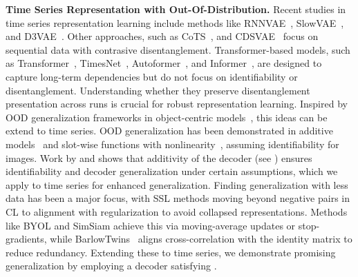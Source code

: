 \documentclass{article} %
\theoremstyle{plain}
\theoremstyle{definition}
\theoremstyle{remark}
\numberwithin{equation}{section}
\begin{document}
\textbf{Time Series Representation with Out-Of-Distribution.} 
Recent studies in time series representation learning include methods like RNNVAE~\citep{chung_recurrent_2015}, SlowVAE~\citep{klindt2020towards}, and D3VAE~\citep{li_generative_2023}. Other approaches, such as CoTS~\citep{woo_cost_2022}, and CDSVAE~\citep{bai_contrastively_nodate} focus on sequential data with contrasive disentanglement. Transformer-based models, such as Transformer~\citep{zerveas2021transformer}, TimesNet~\citep{timesnet}, Autoformer~\citep{autoformer}, and Informer~\citep{zhou2021informer}, are designed to capture long-term dependencies but do not focus on identifiability or disentanglement. Understanding whether they preserve disentanglement presentation across runs is crucial for robust representation learning.
Inspired by OOD generalization frameworks in object-centric models~\citep{zhao2022toward, netanyahuLearningExtrapolateTransductive2023}, this ideas can be extend to time series. OOD generalization has been demonstrated in additive models~\citep{dongFirstStepsUnderstanding2022} and slot-wise functions with nonlinearity~\citep{wiedemer2023compositional}, assuming identifiability for images. Work by \citep{lachapelle2023additive} and \citep{wiedemer2023provable} shows that additivity of the decoder (see ) ensures identifiability and decoder generalization under certain assumptions, which we apply to time series for enhanced generalization. Finding generalization with less data has been a major focus, with SSL methods moving beyond negative pairs in CL to alignment with regularization to avoid collapsed representations. Methods like {BYOL}\citep{grill2020bootstrap} and {SimSiam}\citep{chen2021exploring} achieve this via moving-average updates or stop-gradients, while {BarlowTwins}~\citep{zbontar_barlow_2021} aligns cross-correlation with the identity matrix to reduce redundancy. Extending these to time series, we demonstrate promising generalization by employing a decoder satisfying .


\end{document}

